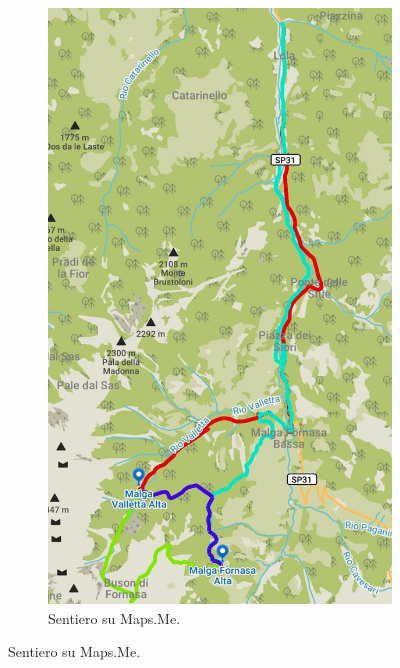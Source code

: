 \documentclass{article}
\begin{document}
\begin{figure}[htbp!]
    \centering
    \begin{subfigure}[t]{0.45\textwidth}
        \centering
        \vspace{0pt} %
        \includegraphics[width=\textwidth]{images/sentiero_mapsMe.jpg}
        \caption{Sentiero su Maps.Me.}
        \label{fig:foto_lunga}
    \end{subfigure}
    \hfill

\end{figure}
\end{document}
